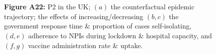 \documentclass[paper=a4,fontsize=11pt]{article}
\begin{document}
\begin{figure}[!h]
  \\
  \hspace{1.76cm}
  \\
  \caption*{\textbf{Figure A22:} P2 in the UK; $(a)$ the counterfactual epidemic trajectory; the effects of increasing/decreasing $(b,c)$ the government response time \& proportion of cases self-isolating, $(d,e)$ adherence to NPIs during lockdown \& hospital capacity, and $(f,g)$ vaccine administration rate \& uptake.}
\end{figure}
\end{document}
